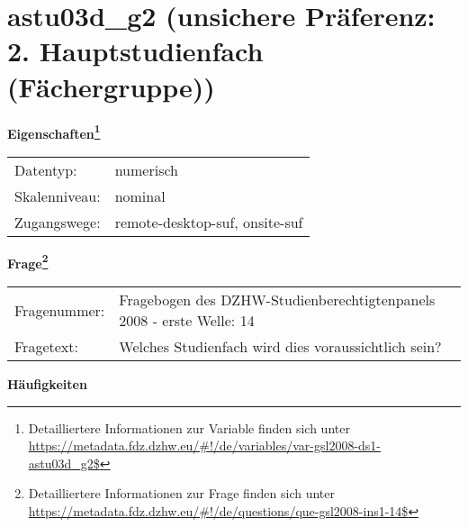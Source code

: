 
    \setcounter{footnote}{0}

    \vspace*{-1.8cm}
	\section{astu03d\_g2 (unsichere Präferenz: 2. Hauptstudienfach (Fächergruppe))}
	\label{section:astu03d_g2}



    \vspace*{0.5cm}
    \noindent\textbf{Eigenschaften\footnote{Detailliertere Informationen zur Variable finden sich unter
		\url{https://metadata.fdz.dzhw.eu/\#!/de/variables/var-gsl2008-ds1-astu03d_g2$}}}\\
	\begin{tabularx}{\hsize}{@{}lX}
	Datentyp: & numerisch \\
	Skalenniveau: & nominal \\
	Zugangswege: &
	  remote-desktop-suf, 
	  onsite-suf
 \\
    \end{tabularx}



				\vspace*{0.5cm}
                \noindent\textbf{Frage\footnote{Detailliertere Informationen zur Frage finden sich unter
		              \url{https://metadata.fdz.dzhw.eu/\#!/de/questions/que-gsl2008-ins1-14$}}}\\
				\begin{tabularx}{\hsize}{@{}lX}
					Fragenummer: &
					  Fragebogen des DZHW-Studienberechtigtenpanels 2008 - erste Welle:
					  14
 \\
					Fragetext: & Welches Studienfach wird dies voraussichtlich sein? \\
				\end{tabularx}





        		\vspace*{0.5cm}
                \noindent\textbf{Häufigkeiten}

